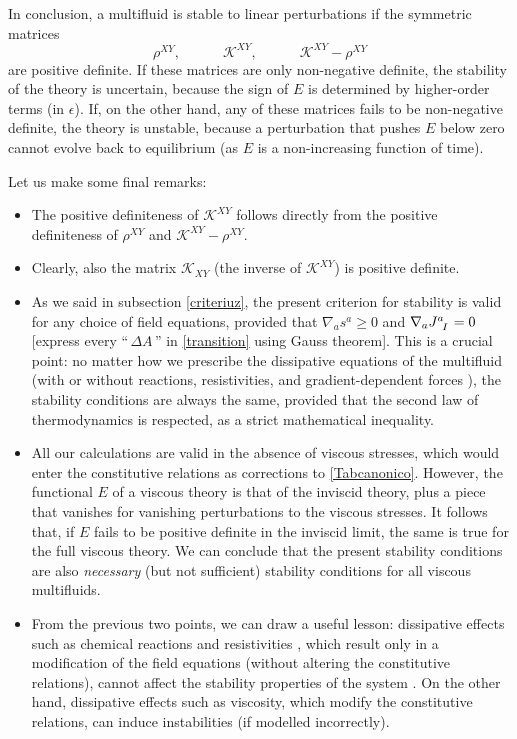 \documentclass[a4paper, amsfonts, amssymb, amsmath, reprint, showkeys, nofootinbib, twoside, onecolumn,notitlepage]{revtex4-1}
\newcommand{\spc}{\quad \quad \quad}
\theoremstyle{definition}
\theoremstyle{theorem}
\begin{document}
In conclusion, a multifluid is stable to linear perturbations if the symmetric matrices
\begin{equation}
\rho^{XY}, \spc \mathcal{K}^{XY}, \spc \mathcal{K}^{XY}-\rho^{XY}
\end{equation}
are positive definite. If these matrices are only non-negative definite, the stability of the theory is uncertain, because the sign of $E$ is determined by higher-order terms (in $\epsilon$). If, on the other hand, any of these matrices fails to be non-negative definite, the theory is unstable, because a perturbation that pushes $E$ below zero cannot evolve back to equilibrium (as $E$ is a non-increasing function of time). 

Let us make some final remarks:
\begin{itemize}
\item The positive definiteness of $\mathcal{K}^{XY}$ follows directly from the positive definiteness of $\rho^{XY}$ and $ \mathcal{K}^{XY}-\rho^{XY}$.  
\item Clearly, also the matrix $\mathcal{K}_{XY}$ (the inverse of $\mathcal{K}^{XY}$) is positive definite.
\item As we said in subsection \ref{criteriuz}, the present criterion for stability is valid for any choice of field equations, provided that $\nabla_a s^a \geq 0$ and $\nabla_a J\indices{^a_I}=0$ [express every ``$\, \Delta A \,$'' in \eqref{transition} using Gauss theorem]. This is a crucial point: no matter how we prescribe the dissipative equations of the multifluid (with or without reactions, resistivities, and gradient-dependent forces \cite{GavassinoRadiazione}), the stability conditions are always the same, provided that the second law of thermodynamics is respected, as a strict mathematical inequality.
\item All our calculations are valid in the absence of viscous stresses, which would enter the constitutive relations as corrections to \eqref{Tabcanonico}. However, the functional $E$ of a viscous theory is that of the inviscid theory, plus a piece that vanishes for vanishing perturbations to the viscous stresses. It follows that, if $E$ fails to be positive definite in the inviscid limit, the same is true for the full viscous theory. We can conclude that the present stability conditions are also \textit{necessary} (but not sufficient) stability conditions for all viscous multifluids.
\item From the previous two points, we can draw a useful lesson: dissipative effects such as chemical reactions and resistivities \cite{carter1991}, which result only in a modification of the field equations (without altering the constitutive relations), cannot affect the stability properties of the system \cite{GavassinoGibbs2021,GavassinoUEIT2021}. On the other hand, dissipative effects such as viscosity, which modify the constitutive relations, can induce instabilities (if modelled incorrectly).
\end{itemize}
\end{document}
